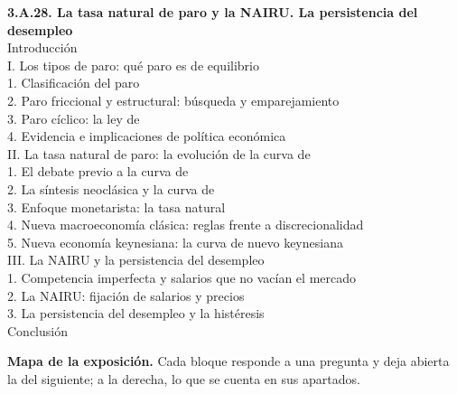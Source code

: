 \documentclass[11pt]{article}
\begin{document}
\begin{esquema}[unbreakable]
\textbf{3.A.28. La tasa natural de paro y la NAIRU. La persistencia del desempleo}\\[2pt]
Introducción\\
I. Los tipos de paro: qué paro es de equilibrio\\
\hspace*{1.5em}1. Clasificación del paro\\
\hspace*{1.5em}2. Paro friccional y estructural: búsqueda y emparejamiento\\
\hspace*{1.5em}3. Paro cíclico: la ley de \\
\hspace*{1.5em}4. Evidencia e implicaciones de política económica\\
II. La tasa natural de paro: la evolución de la curva de \\
\hspace*{1.5em}1. El debate previo a la curva de \\
\hspace*{1.5em}2. La síntesis neoclásica y la curva de \\
\hspace*{1.5em}3. Enfoque monetarista: la tasa natural\\
\hspace*{1.5em}4. Nueva macroeconomía clásica: reglas frente a discrecionalidad\\
\hspace*{1.5em}5. Nueva economía keynesiana: la curva de  nuevo keynesiana\\
III. La NAIRU y la persistencia del desempleo\\
\hspace*{1.5em}1. Competencia imperfecta y salarios que no vacían el mercado\\
\hspace*{1.5em}2. La NAIRU: fijación de salarios y precios\\
\hspace*{1.5em}3. La persistencia del desempleo y la histéresis\\
Conclusión
\end{esquema}

\begin{anotaciones}
\textbf{Mapa de la exposición.} Cada bloque responde a una pregunta y deja abierta la del siguiente; a la derecha, lo que se cuenta en sus apartados.
\begin{infografiacaja}
\caption{Mapa de la exposición: la pregunta de cada bloque y el hilo que los une}\label{figu:mapa-tema}
\end{infografiacaja}
\end{anotaciones}
\end{document}
